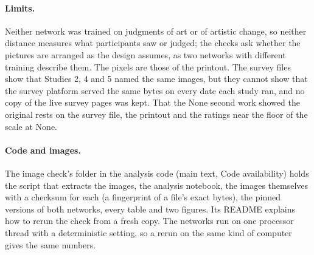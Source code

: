 \paragraph*{Limits.}
Neither network was trained on judgments of art or of artistic change, so neither distance measures what participants saw or judged; the checks ask whether the pictures are arranged as the design assumes, as two networks with different training describe them. The pixels are those of the printout. The survey files show that Studies 2, 4 and 5 named the same images, but they cannot show that the survey platform served the same bytes on every date each study ran, and no copy of the live survey pages was kept. That the None second work showed the original rests on the survey file, the printout and the ratings near the floor of the scale at None.

\paragraph*{Code and images.}
The image check's folder in the analysis code (main text, Code availability) holds the script that extracts the images, the analysis notebook, the images themselves with a checksum for each (a fingerprint of a file's exact bytes), the pinned versions of both networks, every table and two figures. Its README explains how to rerun the check from a fresh copy. The networks run on one processor thread with a deterministic setting, so a rerun on the same kind of computer gives the same numbers.
